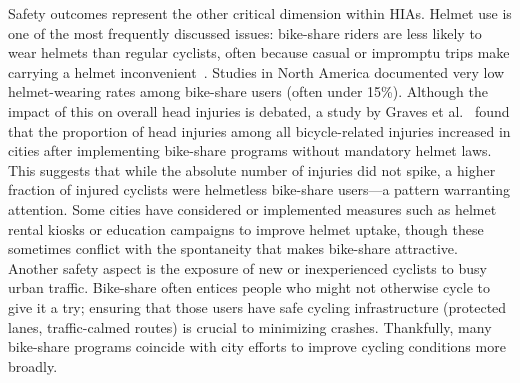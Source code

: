     Safety outcomes represent the other critical dimension within HIAs. Helmet use is one of the most frequently discussed issues: bike-share riders are less likely to wear helmets than regular cyclists, often because casual or impromptu trips make carrying a helmet inconvenient~\cite{Fishman2016}. Studies in North America documented very low helmet-wearing rates among bike-share users (often under 15\%). Although the impact of this on overall head injuries is debated, a study by Graves et al.~\cite{Graves2014} found that the proportion of head injuries among all bicycle-related injuries increased in cities after implementing bike-share programs without mandatory helmet laws. This suggests that while the absolute number of injuries did not spike, a higher fraction of injured cyclists were helmetless bike-share users—a pattern warranting attention. Some cities have considered or implemented measures such as helmet rental kiosks or education campaigns to improve helmet uptake, though these sometimes conflict with the spontaneity that makes bike-share attractive. Another safety aspect is the exposure of new or inexperienced cyclists to busy urban traffic. Bike-share often entices people who might not otherwise cycle to give it a try; ensuring that those users have safe cycling infrastructure (protected lanes, traffic-calmed routes) is crucial to minimizing crashes. Thankfully, many bike-share programs coincide with city efforts to improve cycling conditions more broadly. 

    


